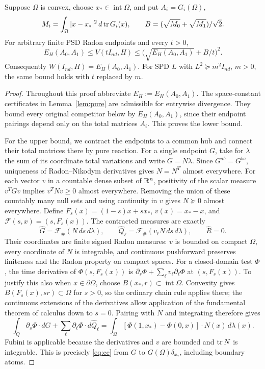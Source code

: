\begin{theorem}\label{thm:hub}
Suppose $\Omega$ is convex, choose $x_*\in\operatorname{int}\Omega$, and
put $A_i=G_i(\Omega)$,
\[
 M_i=\int_\Omega|x-x_*|^2\,d\operatorname{tr} G_i(x),\qquad
 B=(\sqrt{M_0}+\sqrt{M_1})/\sqrt2.
\]
For arbitrary finite PSD Radon endpoints and every $t>0$,
\begin{equation}\label{eq:hub}
 E_H(A_0,A_1)\le V(tI_{nd},H)
 \le\bigl(\sqrt{E_H(A_0,A_1)}+B/t\bigr)^2.
\end{equation}
Consequently $W(I_{nd},H)=E_H(A_0,A_1)$. For SPD $L$ with
$L^2\succeq m^2I_{nd}$, $m>0$, the same bound holds with $t$ replaced by $m$.
\end{theorem}
\begin{proof}
Throughout this proof abbreviate $E_H:=E_H(A_0,A_1)$.
The space-constant certificates in Lemma~\ref{lem:pure} are admissible
for entrywise divergence. They bound every original competitor below by
$E_H(A_0,A_1)$, since their endpoint pairings depend only on the total
matrices $A_i$. This proves the lower bound.

For the upper bound, we contract the endpoints to a common hub and
connect their total matrices there by pure reaction. For a single endpoint
$G$, take for $\lambda$ the sum of its coordinate total variations and
write $G=N\lambda$. Since
$G^{ab}=G^{ba}$, uniqueness of Radon--Nikodym derivatives gives
$N=N^T$ almost everywhere. For each vector $v$ in a countable dense subset
of $\mathbb R^n$, positivity of the scalar measure $v^TGv$ implies
$v^TNv\ge0$ almost everywhere. Removing the union of these countably many
null sets and using continuity in $v$ gives $N\succeq0$ almost everywhere.
Define $F_s(x)=(1-s)x+sx_*$, $v(x)=x_*-x$, and
$\mathcal F(s,x)=(s,F_s(x))$. The contracted measures are exactly
\[
 \widehat G=\mathcal F_\#(N\,ds\,d\lambda),\qquad
 \widehat Q_\ell=\mathcal F_\#(v_\ell N\,ds\,d\lambda),\qquad
 \widehat R=0.
\]
Their coordinates are finite signed Radon measures: $v$ is bounded on
compact $\Omega$, every coordinate of $N$ is integrable, and continuous
pushforward preserves finiteness and the Radon property on compact spaces.
For a closed-domain test $\Phi$, the time derivative of
$\Phi(s,F_s(x))$ is
$\partial_s\Phi+\sum_\ell v_\ell\partial_\ell\Phi$ at $(s,F_s(x))$.
To justify this also when $x\in\partial\Omega$, choose
$B(x_*,r)\subset\operatorname{int}\Omega$. Convexity gives
$B(F_s(x),sr)\subset\Omega$ for $s>0$, so the ordinary chain rule applies
there; the continuous extensions of the derivatives allow application of the
fundamental theorem of calculus down to $s=0$. Pairing with $N$ and integrating
therefore gives
\[
 \int_Q\partial_s\Phi\cdot d\widehat G+
          \sum_\ell\partial_\ell\Phi\cdot d\widehat Q_\ell
 =\int_\Omega[\Phi(1,x_*)-\Phi(0,x)]\cdot N(x)\,d\lambda(x).
\]
Fubini is applicable because the derivatives and $v$ are bounded and
$\operatorname{tr} N$ is integrable. This is precisely \eqref{eq:ce} from $G$ to
$G(\Omega)\delta_{x_*}$, including boundary atoms.


\end{proof}
